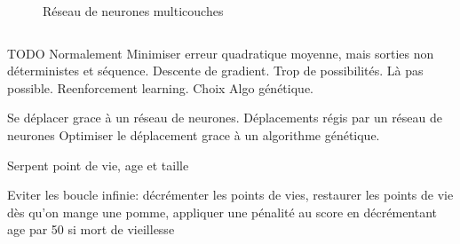 \documentclass[10pt]{beamer}
\begin{document}
\begin{frame}
\begin{columns}[T]
\begin{column}{0.4\textwidth}
\begin{figure}
{
}
\caption*{\tiny Réseau de neurones multicouches}
\end{figure}
\end{column}
\end{columns}
\end{frame}

\begin{frame}
TODO
Normalement Minimiser erreur quadratique moyenne, mais sorties non déterministes et séquence.
Descente de gradient.
Trop de possibilités.
Là pas possible.
Reenforcement learning.
Choix Algo génétique.

Se déplacer grace à un réseau de neurones.
Déplacements régis par un réseau de neurones
Optimiser le déplacement grace à un algorithme génétique.

Serpent point de vie, age et taille

Eviter les boucle infinie: décrémenter les points de vies, restaurer les points de vie dès qu'on mange une pomme, appliquer une pénalité au score en décrémentant age par 50 si mort de vieillesse
\end{frame}
\end{document}
